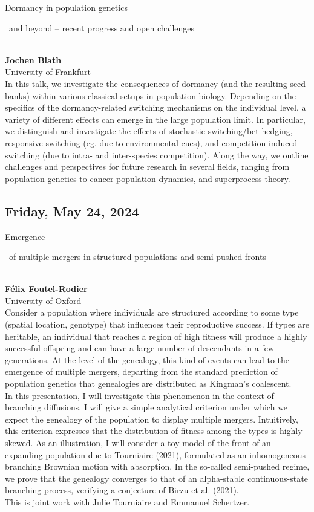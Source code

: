 \documentclass[12pt,a4paper]{article}
\newcommand{\ZAbst}{\rule[-1ex]{0pt}{2ex}\ } %
\begin{document}
\noindent
{\Large Dormancy in population genetics\ZAbst and beyond -- recent progress and open challenges}\\[1ex]
{\large\textbf{Jochen Blath}\\[1ex] University of Frankfurt}\\[2ex]
In this talk, we investigate the consequences of dormancy (and the resulting seed banks) within various classical setups in population biology. Depending on the specifics of the dormancy-related switching mechanisms on the individual level, a variety of different effects can emerge in the large population limit. In particular, we distinguish and investigate the effects of stochastic switching/bet-hedging, responsive switching (eg. due to environmental cues), and competition-induced switching (due to intra- and inter-species competition). Along the way, we outline challenges and perspectives for future research in several fields, ranging from population genetics to cancer population dynamics, and superprocess theory.

\newpage
\subsection*{\sffamily Friday, May 24, 2024}


{\Large  
Emergence\ZAbst of multiple mergers in structured populations and semi-pushed fronts
}\\[1ex]
{\large 
\textbf{Félix Foutel-Rodier}\\[1ex] University of Oxford}\\[2ex]
Consider a population where individuals are structured according to some type (spatial location, genotype) that influences their reproductive success. If types are heritable, an individual that reaches a region of high fitness will produce a highly successful offspring and can have a large number of descendants in a few generations. At the level of the genealogy, this kind of events can lead to the emergence of multiple mergers, departing from the standard prediction of population genetics that genealogies are distributed as Kingman's coalescent.
\\
In this presentation, I will investigate this phenomenon in the context of branching diffusions. I will give a simple analytical criterion under which we expect the genealogy of the population to display multiple mergers. Intuitively, this criterion expresses that the distribution of fitness among the types is highly skewed. As an illustration, I will consider a toy model of the front of an expanding population due to Tourniaire (2021), formulated as an inhomogeneous branching Brownian motion with absorption. In the so-called semi-pushed regime, we prove that the genealogy converges to that of an alpha-stable continuous-state branching process, verifying a conjecture of Birzu et al. (2021).
\\
This is joint work with Julie Tourniaire and Emmanuel Schertzer.
\end{document}
